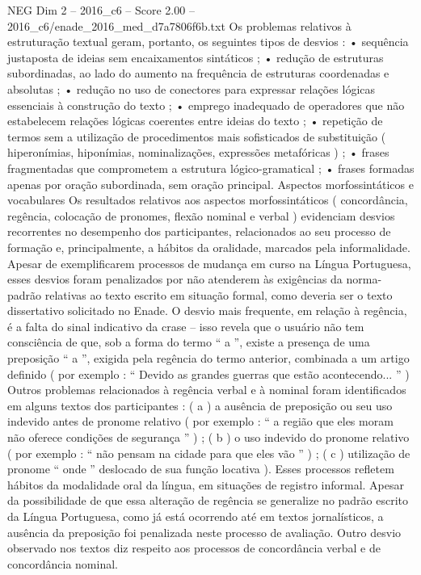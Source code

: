 \begin{textsample}{NEG Dim 2 – 2016\_c6 – Score 2.00 – 2016\_c6/enade\_2016\_med\_d7a7806f6b.txt}
Os problemas relativos à estruturação textual geram, portanto, os seguintes tipos de desvios : • sequência justaposta de ideias sem encaixamentos sintáticos ; • redução de estruturas subordinadas, ao lado do aumento na frequência de estruturas coordenadas e absolutas ; • redução no uso de conectores para expressar relações lógicas essenciais à construção do texto ; • emprego inadequado de operadores que não estabelecem relações lógicas coerentes entre ideias do texto ; • repetição de termos sem a utilização de procedimentos mais sofisticados de substituição ( hiperonímias, hiponímias, nominalizações, expressões metafóricas ) ; • frases fragmentadas que comprometem a estrutura lógico-gramatical ; • frases formadas apenas por oração subordinada, sem oração principal.
Aspectos morfossintáticos e vocabulares Os resultados relativos aos aspectos morfossintáticos ( concordância, regência, colocação de pronomes, flexão nominal e verbal ) evidenciam desvios recorrentes no desempenho dos participantes, relacionados ao seu processo de formação e, principalmente, a hábitos da oralidade, marcados pela informalidade.
Apesar de exemplificarem processos de mudança em curso na Língua Portuguesa, esses desvios foram penalizados por não atenderem às exigências da norma-padrão relativas ao texto escrito em situação formal, como deveria ser o texto dissertativo solicitado no Enade.
O desvio mais frequente, em relação à regência, é a falta do sinal indicativo da crase – isso revela que o usuário não tem consciência de que, sob a forma do termo “ a ”, existe a presença de uma preposição “ a ”, exigida pela regência do termo anterior, combinada a um artigo definido ( por exemplo : “ Devido as grandes guerras que estão acontecendo... ” ) Outros problemas relacionados à regência verbal e à nominal foram identificados em alguns textos dos participantes : ( a ) a ausência de preposição ou seu uso indevido antes de pronome relativo ( por exemplo : “ a região que eles moram não oferece condições de segurança ” ) ; ( b ) o uso indevido do pronome relativo ( por exemplo : “ não pensam na cidade para que eles vão ” ) ; ( c ) utilização de pronome “ onde ” deslocado de sua função locativa ).
Esses processos refletem hábitos da modalidade oral da língua, em situações de registro informal.
Apesar da possibilidade de que essa alteração de regência se generalize no padrão escrito da Língua Portuguesa, como já está ocorrendo até em textos jornalísticos, a ausência da preposição foi penalizada neste processo de avaliação.
Outro desvio observado nos textos diz respeito aos processos de concordância verbal e de concordância nominal.

\end{textsample}

